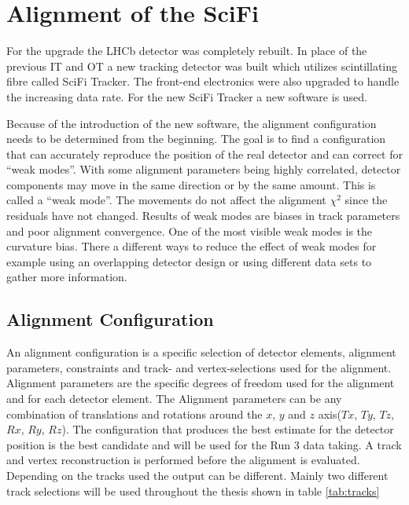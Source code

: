 \chapter{Alignment of the SciFi}
\label{sec:story}

For the upgrade the LHCb detector was completely rebuilt. In place of the previous IT and OT a new tracking detector was built which utilizes scintillating fibre called SciFi Tracker. The front-end electronics were also upgraded to handle the increasing data rate. For the new SciFi Tracker a new software is used.

Because of the introduction of the new software, the alignment configuration needs to be determined from the beginning. The goal is to find a configuration that can accurately reproduce the position of the real detector and can correct for ``weak modes''.
With some alignment parameters being highly correlated, detector components may move in the same direction or by the same amount. This is called a ``weak mode''. The movements do not affect the alignment $\chi^2$ since the residuals have not changed. Results of weak modes are biases in track parameters and poor alignment convergence.
One of the most visible weak modes is the curvature bias. There a different ways to reduce the effect of weak modes for example using an overlapping detector design or using different data sets to gather more information.

\section{Alignment Configuration}

An alignment configuration is a specific selection of detector elements, alignment parameters, constraints and track- and vertex-selections used for the alignment.
Alignment parameters are the specific degrees of freedom used for the alignment and for each detector element. The Alignment parameters can be any combination of translations and rotations around the $x$, $y$ and $z$ axis($Tx$, $Ty$, $Tz$, $Rx$, $Ry$, $Rz$).
The configuration that produces the best estimate for the detector position is the best candidate and will be used for the Run 3 data taking.
A track and vertex reconstruction is performed before the alignment is evaluated. Depending on the tracks used the output can be different. Mainly two different track selections will be used throughout the thesis shown in table \ref{tab:tracks}

